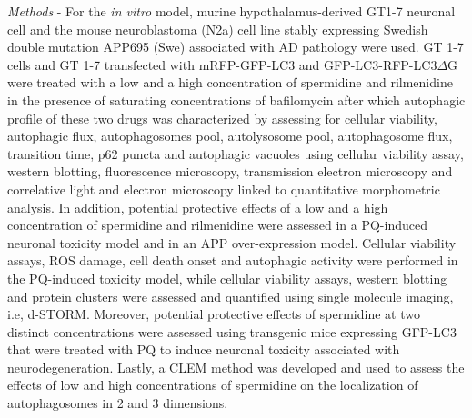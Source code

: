 \textit{Methods} - For the \textit{in vitro} model, murine hypothalamus-derived GT1-7 neuronal cell and the mouse neuroblastoma (N2a) cell line stably expressing Swedish  double mutation APP695 (Swe) associated with AD pathology were used. GT 1-7 cells and GT 1-7 transfected with mRFP-GFP-LC3 and GFP-LC3-RFP-LC3$\Delta$G were treated with a low and a high concentration of spermidine and rilmenidine in the presence of saturating concentrations of bafilomycin after which autophagic profile of these two drugs was characterized by assessing for cellular viability, autophagic flux, autophagosomes pool, autolysosome pool, autophagosome flux, transition time, p62 puncta and autophagic vacuoles using cellular viability assay, western blotting, fluorescence microscopy, transmission electron microscopy and correlative light and electron microscopy linked to quantitative morphometric analysis. In addition, potential protective effects of a low and a high concentration of  spermidine and rilmenidine were assessed in a PQ-induced neuronal toxicity model and in an APP over-expression model. Cellular viability assays, ROS damage, cell death onset and autophagic activity were performed in the PQ-induced toxicity model, while cellular viability assays, western blotting and protein clusters were assessed and quantified using single molecule imaging, i.e, d-STORM. Moreover, potential protective effects of spermidine at two distinct concentrations were assessed using transgenic mice expressing GFP-LC3 that were treated with PQ to induce neuronal toxicity associated with neurodegeneration. Lastly, a CLEM method was developed and used to assess the effects of low and high concentrations of spermidine on the localization of autophagosomes in 2 and 3 dimensions. 

